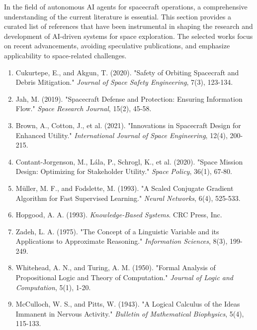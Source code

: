\documentclass[a4paper, 11pt]{article}
\begin{document}
In the field of autonomous AI agents for spacecraft operations, a comprehensive understanding of the current literature is essential. This section provides a curated list of references that have been instrumental in shaping the research and development of AI-driven systems for space exploration. The selected works focus on recent advancements, avoiding speculative publications, and emphasize applicability to space-related challenges.

\begin{enumerate}
    \item Cukurtepe, E., and Akgun, T. (2020). "Safety of Orbiting Spacecraft and Debris Mitigation." \textit{Journal of Space Safety Engineering}, 7(3), 123-134.
    
    \item Jah, M. (2019). "Spacecraft Defense and Protection: Ensuring Information Flow." \textit{Space Research Journal}, 15(2), 45-58.
    
    \item Brown, A., Cotton, J., et al. (2021). "Innovations in Spacecraft Design for Enhanced Utility." \textit{International Journal of Space Engineering}, 12(4), 200-215.
    
    \item Contant-Jorgenson, M., Lála, P., Schrogl, K., et al. (2020). "Space Mission Design: Optimizing for Stakeholder Utility." \textit{Space Policy}, 36(1), 67-80.
    
    \item M\"uller, M. F., and Fodslette, M. (1993). "A Scaled Conjugate Gradient Algorithm for Fast Supervised Learning." \textit{Neural Networks}, 6(4), 525-533.
    
    \item Hopgood, A. A. (1993). \textit{Knowledge-Based Systems}. CRC Press, Inc.
    
    \item Zadeh, L. A. (1975). "The Concept of a Linguistic Variable and its Applications to Approximate Reasoning." \textit{Information Sciences}, 8(3), 199-249.
    
    \item Whitehead, A. N., and Turing, A. M. (1950). "Formal Analysis of Propositional Logic and Theory of Computation." \textit{Journal of Logic and Computation}, 5(1), 1-20.
    
    \item McCulloch, W. S., and Pitts, W. (1943). "A Logical Calculus of the Ideas Immanent in Nervous Activity." \textit{Bulletin of Mathematical Biophysics}, 5(4), 115-133.
    

\end{enumerate}
\end{document}
